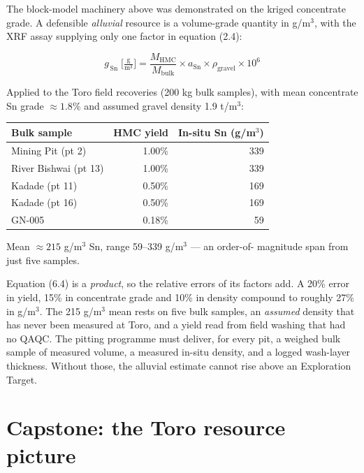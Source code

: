 \documentclass[11pt]{article}
\begin{document}
The block-model machinery above was demonstrated on the kriged
concentrate grade. A defensible \emph{alluvial} resource is a
volume-grade quantity in g/m$^3$, with the XRF assay supplying only one
factor in equation (2.4):

\begin{eqbox}
\[ g_{\,\mathrm{Sn}}\;\Big[\tfrac{\text{g}}{\text{m}^3}\Big]
   = \frac{M_{\text{HMC}}}{M_{\text{bulk}}} \times a_{\text{Sn}}
   \times \rho_{\text{gravel}} \times 10^{6} \tag{6.4}\]
\end{eqbox}

Applied to the Toro field recoveries (200 kg bulk samples), with mean
concentrate Sn grade $\approx 1.8\%$ and assumed gravel density
1.9 t/m$^3$:

\begin{center}\small
\begin{tabular}{@{}lrr@{}}
\toprule
\textbf{Bulk sample} & \textbf{HMC yield} & \textbf{In-situ Sn (g/m$^3$)}\\
\midrule
Mining Pit (pt 2)     & 1.00\% & 339\\
River Bishwai (pt 13) & 1.00\% & 339\\
Kadade (pt 11)        & 0.50\% & 169\\
Kadade (pt 16)        & 0.50\% & 169\\
GN-005                & 0.18\% &  59\\
\bottomrule
\end{tabular}
\end{center}

Mean $\approx 215$ g/m$^3$ Sn, range 59--339 g/m$^3$ --- an order-of-
magnitude span from just five samples.

\begin{pitbox}
Equation (6.4) is a \emph{product}, so the relative errors of its factors
add. A 20\% error in yield, 15\% in concentrate grade and 10\% in density
compound to roughly 27\% in g/m$^3$. The 215 g/m$^3$ mean rests on five
bulk samples, an \emph{assumed} density that has never been measured at
Toro, and a yield read from field washing that had no QAQC. The pitting
programme must deliver, for every pit, a weighed bulk sample of measured
volume, a measured in-situ density, and a logged wash-layer thickness.
Without those, the alluvial estimate cannot rise above an Exploration
Target.
\end{pitbox}

\section{Capstone: the Toro resource picture}
\end{document}
